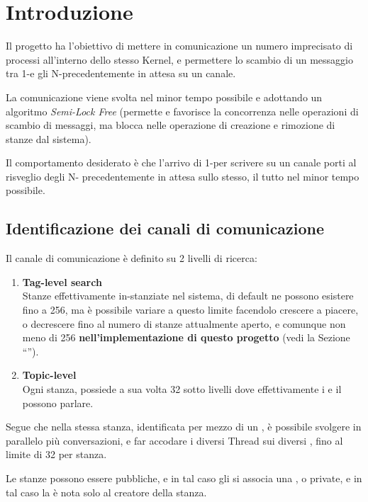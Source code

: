 \section{Introduzione}

Il progetto ha l'obiettivo di mettere in comunicazione un numero imprecisato di processi all'interno dello stesso
Kernel, e permettere lo scambio di un messaggio tra 1-\Writer e gli N-\Reader precedentemente in attesa su un
canale.

La comunicazione viene svolta nel minor tempo possibile e adottando un algoritmo \textit{Semi-Lock Free} (permette e
favorisce la concorrenza nelle operazioni di scambio di messaggi, ma blocca nelle operazione di creazione e rimozione
di stanze dal sistema).

Il comportamento desiderato è che l'arrivo di 1-\Writer per scrivere su un canale porti al risveglio degli N-\Reader
precedentemente in attesa sullo stesso, il tutto nel minor tempo possibile.

\subsection{Identificazione dei canali di comunicazione}
Il canale di comunicazione è definito su 2 livelli di ricerca:
\begin{enumerate}
    \item \textbf{Tag-level search} \\
    Stanze effettivamente in-stanziate nel sistema, di default ne possono esistere fino a 256,
    ma è possibile variare a \RunTime questo limite facendolo crescere a piacere, o decrescere fino al
    numero di stanze attualmente aperto, e comunque non meno di 256 \textbf{nell'implementazione di questo progetto}
    (vedi la Sezione ``'').
    \item \textbf{Topic-level} \\
    Ogni stanza, possiede a sua volta 32 sotto livelli dove effettivamente i \Reader e il \Writer  possono parlare.
\end{enumerate}

Segue che nella stessa stanza, identificata per mezzo di un \tagSys, è possibile svolgere in parallelo più
conversazioni, e far accodare i diversi Thread sui diversi \Topic, fino al limite di 32 \Topic per
stanza.

Le stanze possono essere pubbliche, e in tal caso gli si associa una \keySys, o private, e in tal caso la \tagSys è
nota solo al creatore della stanza.

